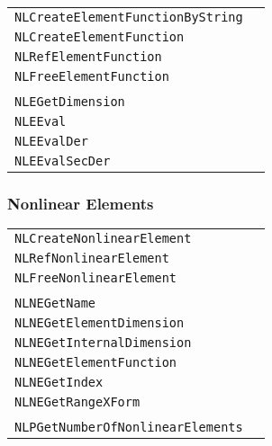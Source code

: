 \documentclass[12pt]{article}
\begin{document}
\begin{center}
\begin{tabular}{ll}
\tt NLCreateElementFunctionByString&\pageref{Subroutine:NLCreateElementFunctionByString}\\
\tt NLCreateElementFunction&\pageref{Subroutine:NLCreateElementFunction}\\
\tt NLRefElementFunction&\pageref{Subroutine:NLRefElementFunction}\\
\tt NLFreeElementFunction&\pageref{Subroutine:NLFreeElementFunction}\\
\\
\tt NLEGetDimension&\pageref{Subroutine:NLEGetDimension}\\
\tt NLEEval&\pageref{Subroutine:NLEEval}\\
\tt NLEEvalDer&\pageref{Subroutine:NLEEvalDer}\\
\tt NLEEvalSecDer&\pageref{Subroutine:NLEEvalSecDer}\\
\end{tabular}
\end{center}

\subsubsection{Nonlinear Elements}

\begin{center}
\begin{tabular}{ll}
\tt NLCreateNonlinearElement&\pageref{Subroutine:NLCreateNonlinearElement}\\
\tt NLRefNonlinearElement&\pageref{Subroutine:NLRefNonlinearElement}\\
\tt NLFreeNonlinearElement&\pageref{Subroutine:NLFreeNonlinearElement}\\
\\
\tt NLNEGetName&\pageref{Subroutine:NLNEGetName}\\
\tt NLNEGetElementDimension&\pageref{Subroutine:NLNEGetElementDimension}\\
\tt NLNEGetInternalDimension&\pageref{Subroutine:NLNEGetInternalDimension}\\
\tt NLNEGetElementFunction&\pageref{Subroutine:NLNEGetElementFunction}\\
\tt NLNEGetIndex&\pageref{Subroutine:NLNEGetIndex}\\
\tt NLNEGetRangeXForm&\pageref{Subroutine:NLNEGetRangeXForm}\\
\\
\tt NLPGetNumberOfNonlinearElements&\pageref{Subroutine:NLPGetNumberOfNonlinearElements}\\
\end{tabular}
\end{center}
\end{document}
